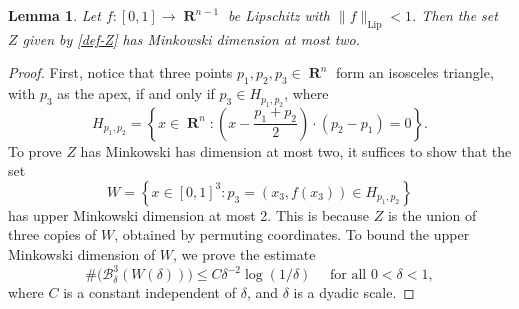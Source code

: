 \documentclass[dvipsnames,letterpaper,12pt]{article}
\numberwithin{equation}{section}
\theoremstyle{plain}
\newtheorem{lemma}{Lemma}
\theoremstyle{remark}
\DeclareMathOperator{\RR}{\mathbf{R}}
\DeclareMathOperator{\setcolon}{\colon}
\begin{document}
\begin{lemma}
	Let $f\colon [0,1] \to \RR^{n-1}$ be Lipschitz with $\| f \|_{\text{Lip}} < 1$. Then the set $Z$ given by \eqref{def-Z} has Minkowski dimension at most two.
\end{lemma}
\begin{proof}
	First, notice that three points $p_1,p_2,p_3 \in \RR^n$ form an isosceles triangle, with $p_3$ as the apex, if and only if $p_3 \in H_{p_1,p_2}$, where
	\begin{equation} \label{def-H}  H_{p_1,p_2} = \left\{ x \in \RR^n \setcolon \left( x - \frac{p_1 + p_2}{2} \right) \cdot (p_2 - p_1) = 0 \right\}. \end{equation} 
	To prove $Z$ has Minkowski has dimension at most two, it suffices to show that the set
	\[ W = \left\{ x \in [0,1]^3 \setcolon p_3 = (x_3,f(x_3)) \in H_{p_1, p_2} \right\} \]
	has upper Minkowski dimension at most 2. This is because $Z$ is the union of three copies of $W$, obtained by permuting coordinates. To bound the upper Minkowski dimension of $W$, we prove the estimate
	\begin{equation}\label{boundOnWCoveringNumber}  \# \bigl(\mathcal B_{\delta}^3(W(\delta)) \bigr) \leq C \delta^{-2} \log(1/\delta) \quad \text{ for all } 0 < \delta < 1,  
	\end{equation}  
	where $C$ is a constant independent of $\delta$, and $\delta$ is a dyadic scale.


\end{proof}
\end{document}
